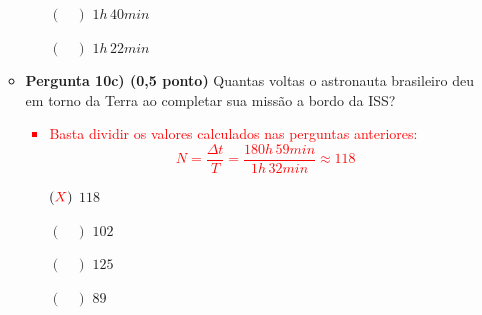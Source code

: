 \documentclass[a4paper, 12pt]{article}
\newcommand{\red}[1]{\textcolor{red}{#1}}
\begin{document}
\begin{flushleft}
\begin{itemize}
\begin{itemize}
\begin{itemize}
                            \item[$(\quad)$] $1h \, 40min$
                            \item[$(\quad)$] $1h \, 22min$
                        \end{itemize}
                    \item \textbf{Pergunta 10c) (0,5 ponto)} Quantas voltas o astronauta brasileiro deu em torno da Terra ao completar sua missão a bordo da ISS?
                        \red{\begin{itemize}
                            \item Basta dividir os valores calculados nas perguntas anteriores:
                                \begin{equation*}
                                    N=\frac{\Delta t}{T}=\frac{180h \, 59min}{1h \, 32min} \approx 118
                                \end{equation*}
                        \end{itemize}}
                        \begin{itemize}
                            \item[$(\red{X})$] $118$
                            \item[$(\quad)$] $102$
                            \item[$(\quad)$] $125$
                            \item[$(\quad)$] $89$
                        \end{itemize}
                \end{itemize}
        \end{itemize} \end{flushleft}
\end{document}
